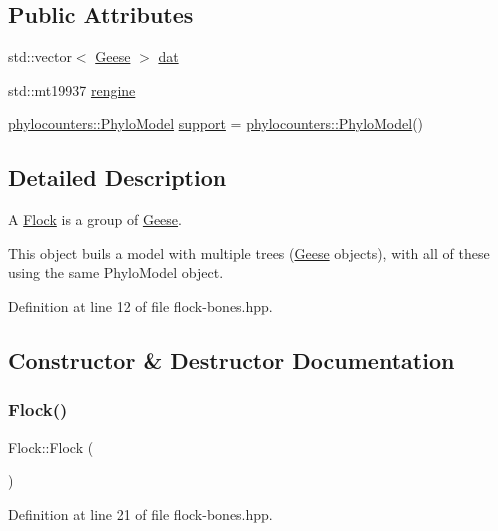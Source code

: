 \subsection*{Public Attributes}
\begin{DoxyCompactItemize}
\item 
std\+::vector$<$ \hyperlink{class_geese}{Geese} $>$ \hyperlink{class_flock_af493163235db2dcb44b8c5e615f52bdb}{dat}
\item 
std\+::mt19937 \hyperlink{class_flock_a0e3ce6d007f667eea9f036cddb6789b6}{rengine}
\item 
\hyperlink{namespacebarry_1_1counters_1_1phylo_ad32b4186e3bab93119df225fddc3c609}{phylocounters\+::\+Phylo\+Model} \hyperlink{class_flock_a20d75da0d423252055af84194e88f901}{support} = \hyperlink{namespacebarry_1_1counters_1_1phylo_ad32b4186e3bab93119df225fddc3c609}{phylocounters\+::\+Phylo\+Model}()
\end{DoxyCompactItemize}


\subsection{Detailed Description}
A \hyperlink{class_flock}{Flock} is a group of \hyperlink{class_geese}{Geese}. 

This object buils a model with multiple trees (\hyperlink{class_geese}{Geese} objects), with all of these using the same Phylo\+Model object. 

Definition at line 12 of file flock-\/bones.\+hpp.



\subsection{Constructor \& Destructor Documentation}
\mbox{\label{class_flock_a2a0a514c368e21f718ad7358ed42f3b7}} 
\subsubsection{\texorpdfstring{Flock()}{Flock()}}
{\footnotesize\ttfamily Flock\+::\+Flock (\begin{DoxyParamCaption}{ }\end{DoxyParamCaption})\hspace{0.3cm}{\ttfamily [inline]}}



Definition at line 21 of file flock-\/bones.\+hpp.

